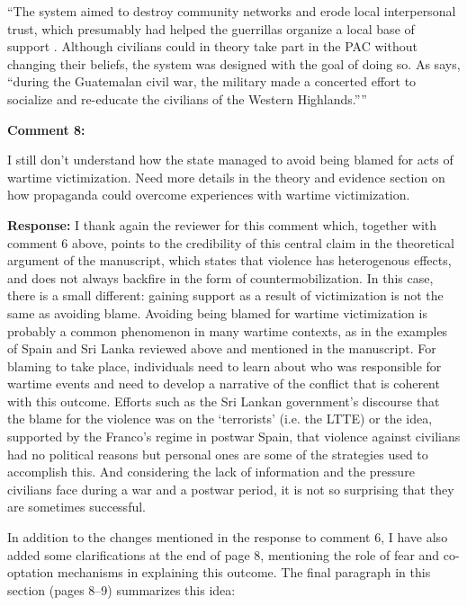 \documentclass[12pt, a4paper, notitlepage]{article}
\begin{document}
``The system aimed to destroy community networks and erode local interpersonal trust, which presumably had helped the guerrillas organize a local base of support \citep{SaenzdeTejada:2004aa}.
Although civilians could in theory take part in the PAC without changing their beliefs, the system was designed with the goal of doing so.
As \citet[641]{Bateson:2017aa} says, ``during the Guatemalan civil war, the military made a concerted effort to socialize and re-educate the civilians of the Western Highlands.''''


\vspace{15pt}
\noindent\textbf{Comment 8:}
\begin{displayquote}
I still don't understand how the state managed to avoid being blamed for acts of wartime victimization. Need more details in the theory and evidence section on how propaganda could overcome experiences with wartime victimization.
\end{displayquote}

\noindent\textbf{Response:} I thank again the reviewer for this comment which, together with comment 6 above, points to the credibility of this central claim in the theoretical argument of the manuscript, which states that violence has heterogenous effects, and does not always backfire in the form of countermobilization. In this case, there is a small different: gaining support as a result of victimization is not the same as avoiding blame. Avoiding being blamed for wartime victimization is probably a common phenomenon in many wartime contexts, as in the examples of Spain and Sri Lanka reviewed above and mentioned in the manuscript. For blaming to take place, individuals need to learn about who was responsible for wartime events and need to develop a narrative of the conflict that is coherent with this outcome. Efforts such as the Sri Lankan government's discourse that the blame for the violence was on the `terrorists' (i.e. the LTTE) or the idea, supported by the Franco's regime in postwar Spain, that violence against civilians had no political reasons but personal ones are some of the strategies used to accomplish this. And considering the lack of information and the pressure civilians face during a war and a postwar period, it is not so surprising that they are sometimes successful.

In addition to the changes mentioned in the response to comment 6, I have also added some clarifications at the end of page 8, mentioning the role of fear and co-optation mechanisms in explaining this outcome. The final paragraph in this section (pages 8--9) summarizes this idea:
\end{document}
